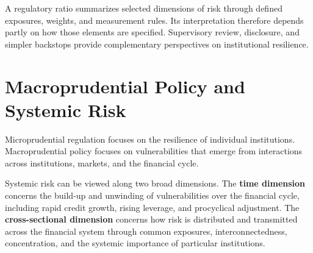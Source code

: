 \begin{tcolorbox}[
enhanced,
breakable,
colback=white,
colframe=FinanceBlue,
boxrule=0.7pt,
sharp corners,
borderline west={2.2pt}{0pt}{FinanceBlue},
title=\textbf{Financial Perspective: Regulatory Ratios Embed Assumptions about Risk},
coltitle=white,
colbacktitle=FinanceBlue,
fonttitle=\bfseries,
before skip=1.2em,
after skip=1.2em
]

A regulatory ratio summarizes selected dimensions of risk through defined exposures, weights, and measurement rules. Its interpretation therefore depends partly on how those elements are specified. Supervisory review, disclosure, and simpler backstops provide complementary perspectives on institutional resilience.

\end{tcolorbox}



\section{Macroprudential Policy and Systemic Risk}

Microprudential regulation focuses on the resilience of individual institutions. Macroprudential policy focuses on vulnerabilities that emerge from interactions across institutions, markets, and the financial cycle.

Systemic risk can be viewed along two broad dimensions. The \textbf{time dimension} concerns the build-up and unwinding of vulnerabilities over the financial cycle, including rapid credit growth, rising leverage, and procyclical adjustment. The \textbf{cross-sectional dimension} concerns how risk is distributed and transmitted across the financial system through common exposures, interconnectedness, concentration, and the systemic importance of particular institutions.

